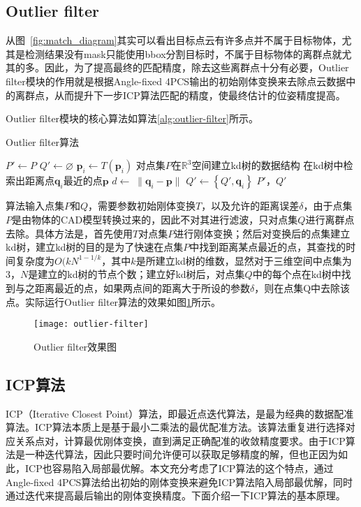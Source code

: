 \subsection{Outlier filter}
从图~\ref{fig:match_diagram}其实可以看出目标点云有许多点并不属于目标物体，尤其是检测结果没有mask只能使用bbox分割目标时，不属于目标物体的离群点就尤其的多。因此，为了提高最终的匹配精度，除去这些离群点十分有必要，Outlier filter模块的作用就是根据Angle-fixed 4PCS输出的初始刚体变换来去除点云数据中的离群点，从而提升下一步ICP算法匹配的精度，使最终估计的位姿精度提高。

Outlier filter模块的核心算法如算法\ref{alg:outlier-filter}所示。
\begin{algorithm}[ht]
  \caption{Outlier filter算法}
  \label{alg:outlier-filter}
  $P'\leftarrow P$\;
  $Q'\leftarrow \varnothing$\;
   {
    $\mathbf{p}_i\leftarrow T(\mathbf{p}_i)$\;
  }
  对点集$P$在$\mathbb{R}^3$空间建立kd树的数据结构\;
   {
    在kd树中检索出距离点$\mathbf{q}_i$最近的点$\mathbf{p}$\;
    $d\leftarrow\;\parallel\mathbf{q}_i-\mathbf{p}\parallel$\;
     {
      $Q'\leftarrow \left\{Q', \mathbf{q}_i\right\}$\;
    }
  }
  \Return $P'$，$Q'$\;
\end{algorithm}
算法输入点集$P$和$Q$，需要参数初始刚体变换$T$，以及允许的距离误差$\delta$，由于点集$P$是由物体的CAD模型转换过来的，因此不对其进行滤波，只对点集$Q$进行离群点去除。具体方法是，首先使用$T$对点集$P$进行刚体变换；然后对变换后的点集建立kd树，建立kd树的目的是为了快速在点集$P$中找到距离某点最近的点，其查找的时间复杂度为$O(kN^{1-1/k}$，其中$k$是所建立kd树的维数，显然对于三维空间中点集为3，$N$是建立的kd树的节点个数；建立好kd树后，对点集$Q$中的每个点在kd树中找到与之距离最近的点，如果两点间的距离大于所设的参数$\delta$，则在点集Q中去除该点。实际运行Outlier filter算法的效果如图\ref{fig:outlier-filter}所示。
\begin{figure}[ht]
  \centering
  \texttt{[image: outlier-filter]}
  \caption{Outlier filter效果图}
  \label{fig:outlier-filter}
\end{figure}


\subsection{ICP算法}
ICP（Iterative Closest Point）算法，即最近点迭代算法，是最为经典的数据配准算法。ICP算法本质上是基于最小二乘法的最优配准方法。该算法重复进行选择对应关系点对，计算最优刚体变换，直到满足正确配准的收敛精度要求。由于ICP算法是一种迭代算法，因此只要时间允许便可以获取足够精度的解，但也正因为如此，ICP也容易陷入局部最优解。本文充分考虑了ICP算法的这个特点，通过Angle-fixed 4PCS算法给出初始的刚体变换来避免ICP算法陷入局部最优解，同时通过迭代来提高最后输出的刚体变换精度。下面介绍一下ICP算法的基本原理。

